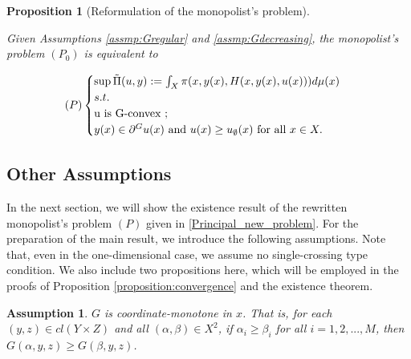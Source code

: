 \documentclass[a4paper, 11pt]{amsart}
\numberwithin{equation}{section}
\theoremstyle{plain}
\newtheorem{proposition}[theorem]{Proposition}
\newtheorem{assumption}{Assumption}
\theoremstyle{definition}
\theoremstyle{remark}
\begin{document}
\begin{proposition}[Reformulation of the monopolist’s problem]\label{equiv_form}
	
	Given Assumptions \ref{assmp:Gregular} and \ref{assmp:Gdecreasing}, the monopolist's problem $(P_0)$ is equivalent to
	
	\begin{equation}\label{Principal_new_problem}
	(P)
	\begin{cases}
	\sup \tilde{\Pi}(u,y):=\int_{X} \pi(x, y(x), H(x,y(x), u(x))) d\mu(x)\\
	s.t.\\
	 $u$ \text{ is } $G$\text{-convex };\\
	 y(x) \in \partial^G u(x) \text{ and }u(x)\ge u_{\emptyset}(x) \text{ for all } x \in X.
	\end{cases}
	\end{equation}
\end{proposition}

\medskip


\subsection{Other Assumptions}\label{subsection:assumptions}
In the next section, we will show the existence result of the rewritten monopolist's problem $(P)$ given in \eqref{Principal_new_problem}. For the preparation of the main result, we introduce the following assumptions. Note that, even in the one-dimensional case, we assume no single-crossing type condition. We also include two propositions here, which will be employed in the proofs of Proposition \ref{proposition:convergence} and the existence theorem. \medskip%





\begin{comment}
	{ is the so-called twist condition which is the similar/dual to but much less restrictive than the generalized single crossing condition proposed by McAfee-McMillan \cite{McAfeeMcMillan88}. Comparing to Figalli-Kim-McCann \cite{FigalliKimMcCann11}}\medskip
\end{comment}


\begin{assumption}\label{assmp:Gcoordinate-monotone}
	$G$ is coordinate-monotone in $x$. That is, for each $(y,z)\in cl(Y\times Z)$ and all $ (\alpha, \beta) \in X^2$, if $\alpha_i\ge \beta_i$ for all $ i=1,2,...,M$, then $G(\alpha,y,z)\ge G(\beta, y,z)$.
\end{assumption}
\end{document}
